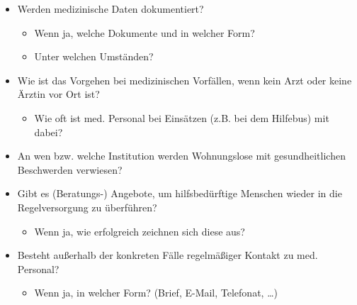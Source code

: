 \begin{itemize}
	\item Werden medizinische Daten dokumentiert?
	\begin{itemize}
		\item Wenn ja, welche Dokumente und in welcher Form?
		\item Unter welchen Umständen?
	\end{itemize}
	\item Wie ist das Vorgehen bei medizinischen Vorfällen, wenn kein Arzt oder keine Ärztin vor Ort ist?
	\begin{itemize}
		\item Wie oft ist med. Personal bei Einsätzen (z.B. bei dem Hilfebus) mit dabei?
	\end{itemize}
	\item An wen bzw. welche Institution werden Wohnungslose mit gesundheitlichen Beschwerden verwiesen?
	\item Gibt es (Beratungs-) Angebote, um hilfsbedürftige Menschen wieder in die Regelversorgung zu überführen?
	\begin{itemize}
		\item Wenn ja, wie erfolgreich zeichnen sich diese aus?
	\end{itemize}
	\item Besteht außerhalb der konkreten Fälle regelmäßiger Kontakt zu med. Personal?
	\begin{itemize}
		\item Wenn ja, in welcher Form? (Brief, E-Mail, Telefonat, …)
	\end{itemize}
\end{itemize}